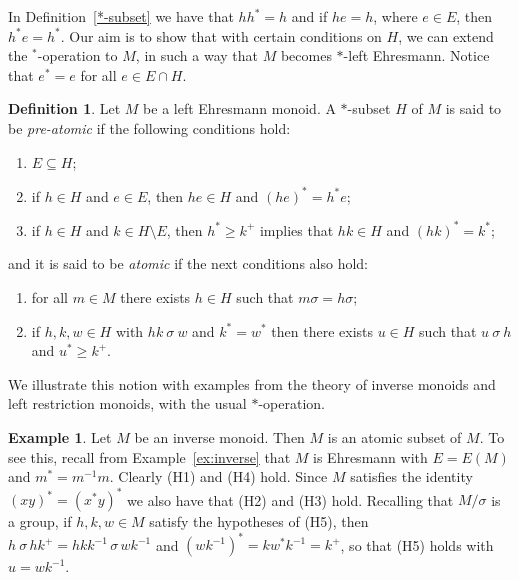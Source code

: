 \documentclass[12pt]{amsart}
\theoremstyle{definition}
\newtheorem{ex}[them]{Example}
\newtheorem{defn}[them]{Definition}
\theoremstyle{definition}
\numberwithin{them}{section}
\numberwithin{equation}{section}
\begin{document}
In Definition~\ref{*-subset}  we have that $hh^*=h$ and if $he=h$, where $e\in E$, then $h^*e=h^*$. Our aim is to show that with certain conditions on $H$, we can extend the $^*$-operation to $M$, in such a way that $M$ becomes $*$-left Ehresmann. Notice that $e^*=e$ for all $e\in E\cap H$. 
\begin{defn}\label{goodset}
Let $M$ be a left Ehresmann  monoid. A $*$-subset $H$ of  $M$ is said to be {\it pre-atomic}   if  the following conditions hold:
\begin{enumerate}
\item[(H1)] $E \subseteq H$;
\item[(H2)]  if $h \in H$ and $e \in  E$, then $he \in H$  and $(he)^\ast = h^\ast e$;
\item[(H3)]  if $h \in H$ and $k \in H\setminus E$, then  $h^{\ast} \geq k^{+}$ implies that $hk\in H$ and  $(hk)^\ast = k^\ast$;
\end{enumerate}

and it is said to be
 {\it atomic}  if  the next conditions also  hold:
\begin{enumerate}
\item[(H4)] for all $m \in M$ there exists $h \in H$ such that $m\sigma = h\sigma$;
\item[(H5)] if $h, k, w \in H$ with $hk\ \sigma\ w$ and $k^\ast = w^{\ast}$ then there exists $u \in H$ such that $u\ \sigma\ h$ and $u^{\ast} \geq k^+$.
\end{enumerate}
\end{defn}
 We illustrate this notion with  examples  from the theory of inverse monoids and left restriction monoids, with the usual $*$-operation.




\begin{ex}\label{ex:inverse2} Let $M$ be an inverse monoid. Then $M$ is an  atomic  subset of $M$.  To see this, recall from Example~\ref{ex:inverse} that $M$ is Ehresmann with $E=E(M)$
 and $m^*=m^{-1}m$.  Clearly (H1)  and (H4) hold. Since $M$ satisfies the identity $(xy)^*=(x^*y)^*$  we also have that (H2) and (H3) hold. Recalling that $M/\sigma$ is a group, if $h,k,w\in M$ satisfy the hypotheses of (H5), then $h\ \sigma \, hk^+=hkk^{-1}\,\sigma\, wk^{-1}$ and
$(wk^{-1})^*=kw^*k^{-1}=k^+$, so that (H5) holds with $u=wk^{-1}$.
\end{ex}
\end{document}
